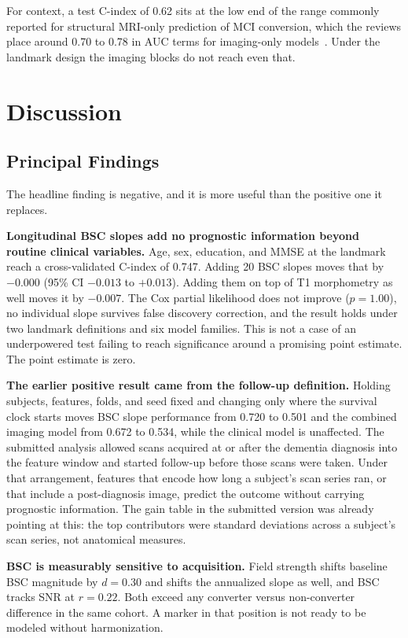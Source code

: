 \documentclass[blue]{ludusofficial}  %
\begin{document}
For context, a test C-index of 0.62 sits at the low end of the range commonly reported for structural MRI-only prediction of MCI conversion, which the reviews place around 0.70 to 0.78 in AUC terms for imaging-only models~\cite{ansart2021predicting}. Under the landmark design the imaging blocks do not reach even that.

\section{Discussion}

\subsection{Principal Findings}

The headline finding is negative, and it is more useful than the positive one it replaces.

\textbf{Longitudinal BSC slopes add no prognostic information beyond routine clinical variables.} Age, sex, education, and MMSE at the landmark reach a cross-validated C-index of 0.747. Adding 20 BSC slopes moves that by $-0.000$ (95\% CI $-0.013$ to $+0.013$). Adding them on top of T1 morphometry as well moves it by $-0.007$. The Cox partial likelihood does not improve ($p=1.00$), no individual slope survives false discovery correction, and the result holds under two landmark definitions and six model families. This is not a case of an underpowered test failing to reach significance around a promising point estimate. The point estimate is zero.

\textbf{The earlier positive result came from the follow-up definition.} Holding subjects, features, folds, and seed fixed and changing only where the survival clock starts moves BSC slope performance from 0.720 to 0.501 and the combined imaging model from 0.672 to 0.534, while the clinical model is unaffected. The submitted analysis allowed scans acquired at or after the dementia diagnosis into the feature window and started follow-up before those scans were taken. Under that arrangement, features that encode how long a subject's scan series ran, or that include a post-diagnosis image, predict the outcome without carrying prognostic information. The gain table in the submitted version was already pointing at this: the top contributors were standard deviations across a subject's scan series, not anatomical measures.

\textbf{BSC is measurably sensitive to acquisition.} Field strength shifts baseline BSC magnitude by $d=0.30$ and shifts the annualized slope as well, and BSC tracks SNR at $r=0.22$. Both exceed any converter versus non-converter difference in the same cohort. A marker in that position is not ready to be modeled without harmonization.
\end{document}
